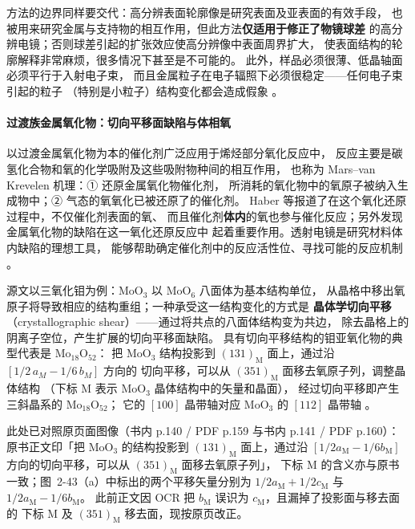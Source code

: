 方法的边界同样要交代：高分辨表面轮廓像是研究表面及亚表面的有效手段，
也被用来研究金属与支持物的相互作用，但此方法\textbf{仅适用于修正了物镜球差}
的高分辨电镜；否则球差引起的扩张效应使高分辨像中表面周界扩大，
使表面结构的轮廓解释非常麻烦，很多情况下甚至是不可能的。
此外，样品必须很薄、低晶轴面必须平行于入射电子束，
而且金属粒子在电子辐照下必须很稳定——任何电子束引起的粒子
（特别是小粒子）结构变化都会造成假象
。

\paragraph{过渡族金属氧化物：切向平移面缺陷与体相氧}
以过渡金属氧化物为本的催化剂广泛应用于烯烃部分氧化反应中，
反应主要是碳氢化合物和氧的化学吸附及这些吸附物种间的相互作用，
也称为 Mars--van Krevelen 机理：① 还原金属氧化物催化剂，
所消耗的氧化物中的氧原子被纳入生成物中；② 气态的氧氧化已被还原了的催化剂。
Haber 等报道了在这个氧化还原过程中，不仅催化剂表面的氧、
而且催化剂\textbf{体内}的氧也参与催化反应；另外发现金属氧化物的缺陷在这一氧化还原反应中
起着重要作用。透射电镜是研究材料体内缺陷的理想工具，
能够帮助确定催化剂中的反应活性位、寻找可能的反应机制
。

源文以三氧化钼为例：MoO$_3$ 以 MoO$_6$ 八面体为基本结构单位，
从晶格中移出氧原子将导致相应的结构重组；一种承受这一结构变化的方式是
\textbf{晶体学切向平移}（crystallographic shear）——通过将共点的八面体结构变为共边，
除去晶格上的阴离子空位，产生扩展的切向平移面缺陷。
具有切向平移结构的钼亚氧化物的典型代表是 Mo$_{18}$O$_{52}$：
把 MoO$_3$ 结构投影到 $(131)_{\mathrm M}$ 面上，通过沿 $[1/2\,a_M-1/6\,b_M]$ 方向的
切向平移，可以从 $(351)_{\mathrm M}$ 面移去氧原子列，调整晶体结构
（下标 M 表示 MoO$_3$ 晶体结构中的矢量和晶面），
经过切向平移即产生三斜晶系的 Mo$_{18}$O$_{52}$；
它的 $[100]$ 晶带轴对应 MoO$_3$ 的 $[112]$ 晶带轴
。

此处已对照原页面图像（书内 p.140 / PDF p.159 与书内 p.141 / PDF p.160）：
原书正文印「把 MoO$_3$ 的结构投影到 $(131)_{\mathrm M}$ 面上，通过沿
$[1/2a_{\mathrm M}-1/6b_{\mathrm M}]$ 方向的切向平移，可以从 $(351)_{\mathrm M}$ 面移去氧原子列」，
下标 M 的含义亦与原书一致；图~2-43（a）中标出的两个平移矢量分别为
$1/2a_{\mathrm M}+1/2c_{\mathrm M}$ 与 $1/2a_{\mathrm M}-1/6b_{\mathrm M}$。
此前正文因 OCR 把 $b_{\mathrm M}$ 误识为 $c_{\mathrm M}$，且漏掉了投影面与移去面的
下标 M 及 $(351)_{\mathrm M}$ 移去面，现按原页改正。

